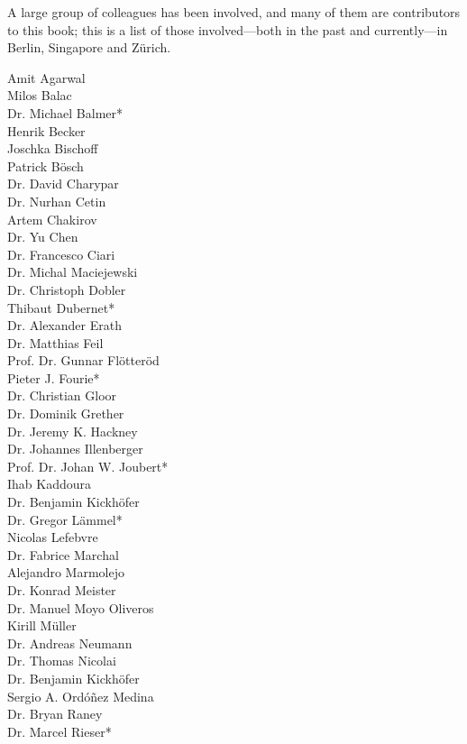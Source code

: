 A large group of colleagues has been involved, and many of them are contributors to this book; this is a list of those involved---both in the past and currently---in Berlin, Singapore and Zürich.  
%
\begin{multicols}{3}
Amit Agarwal \\
Milos Balac  \\
Dr. Michael Balmer\mbox{*} \\
Henrik Becker \\
Joschka Bischoff \\
Patrick Bösch \\
Dr. David Charypar \\
Dr. Nurhan Cetin  \\
Artem Chakirov \\
Dr. Yu Chen \\
Dr. Francesco Ciari \\
Dr. Michal Maciejewski \\
Dr. Christoph Dobler \\
Thibaut Dubernet\mbox{*} \\
Dr. Alexander Erath \\
Dr. Matthias Feil \\
Prof. Dr. Gunnar Flötteröd \\
Pieter J. Fourie\mbox{*} \\
Dr. Christian Gloor \\
Dr. Dominik Grether \\
Dr. Jeremy K. Hackney \\
Dr. Johannes Illenberger \\
Prof. Dr. Johan W. Joubert\mbox{*} \\
Ihab Kaddoura \\
Dr. Benjamin Kickhöfer \\
Dr. Gregor Lämmel\mbox{*} \\
Nicolas Lefebvre \\
Dr. Fabrice Marchal \\
Alejandro Marmolejo \\
Dr. Konrad Meister \\
Dr. Manuel Moyo Oliveros \\
Kirill Müller \\
Dr. Andreas Neumann \\
Dr. Thomas Nicolai \\
Dr. Benjamin Kickhöfer \\
Sergio A. Ordóñez Medina \\
Dr. Bryan Raney \\
Dr. Marcel Rieser\mbox{*} \\

\end{multicols}
